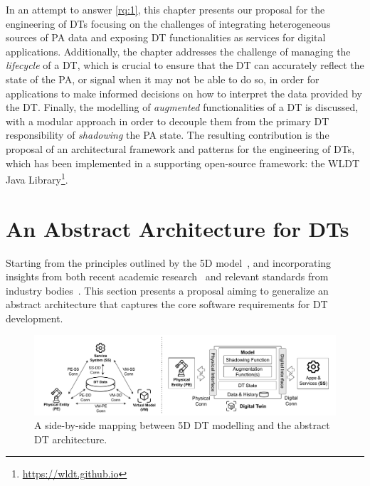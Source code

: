 In an attempt to answer \ref{rq:1}, 
this chapter presents our proposal for the engineering of \acp{DT}
focusing on the challenges of integrating heterogeneous sources of \ac{PA} data
and exposing \ac{DT} functionalities as services for digital applications.
%
Additionally, the chapter addresses the challenge of managing the \emph{lifecycle} of a \ac{DT}, 
which is crucial to ensure that the \ac{DT} can accurately reflect the state of the \ac{PA}, 
or signal when it may not be able to do so, in order for applications to make informed decisions on how to 
interpret the data provided by the \ac{DT}.
%
Finally, the modelling of \emph{augmented} functionalities of a \ac{DT} is discussed, with a modular approach
in order to decouple them from the primary \ac{DT} responsibility of \emph{shadowing} the \ac{PA} state. 
%
The resulting contribution is the proposal of an architectural framework and patterns for the engineering of \acp{DT}, 
which has been implemented in a supporting open-source framework: the \ac{WLDT} Java Library\footnote{\url{https://wldt.github.io}}.

\section{An Abstract Architecture for \aclp{DT}}
\label{sec:dte:engineering-dt:abstract-architecture}
Starting from the principles outlined by the 5D model~\cite{dt-driven-prognostics-tao-2018},
and incorporating insights from both recent academic research~\cite{web-of-dt-ricci-2022,Bellavista_Bicocchi_Fogli_Giannelli_Mamei_Picone_2023} and relevant standards from industry bodies~\cite{etsi-dt-comm-requirements-2024}.
This section presents a proposal aiming to generalize an abstract architecture that captures the core software requirements for \ac{DT} development.

\begin{figure}[t]
    \centering
    \includegraphics[width=\textwidth]{figures/mapping-Tao-WLDT.pdf}
    \caption{A side-by-side mapping between 5D DT modelling and the abstract \ac{DT} architecture.}
    \label{fig:tao_mapping_dt_modelling}
\end{figure}

